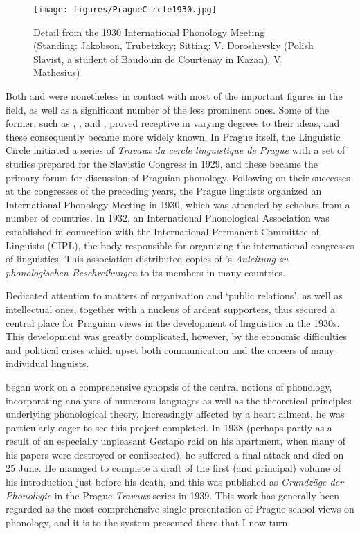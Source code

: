 \begin{wrapfigure}{r}{.4\textwidth}
  \texttt{[image: figures/PragueCircle1930.jpg]}
  \caption{Detail from the 1930 International Phonology Meeting\\
    (Standing: Jakobson, Trubetzkoy; Sitting: V. Doroshevsky (Polish
    Slavist, a student of Baudouin de Courtenay in Kazan),
    V. Mathesius)}
  \label{fig:ch.prague_trubetzkoy_prague_circle}
\end{wrapfigure}
Both {\Jakobson} and {\Trubetzkoy} were none\-the\-less in contact with most of the
important figures in the field, as well as a significant number of the
less prominent ones. Some of the former, such as {\Sapir}, {\Meillet}, and
, proved receptive in varying degrees to their ideas, and
these consequently became more widely known. In Prague itself, the
Linguistic Circle initiated a series of \textsl{Travaux du cercle
  linguistique de Prague} with a set of studies prepared for the
Slavistic Congress in 1929, and these became the primary forum for
discussion of Praguian phonology. Following on their successes at the
congresses of the preceding years, the Prague linguists organized an
International Phonology Meeting in 1930, which was attended by
scholars from a number of countries. In 1932, an International
Phonological Association was established in connection with the
International Permanent Committee of Linguists (CIPL), the body
responsible for organizing the international congresses of
linguistics. This association distributed copies of {\Trubetzkoy}'s
\textsl{Anleitung zu phonologischen Beschreibungen}
\citep{trubetzkoy68:principles} to its members in many countries.

Dedicated attention to matters of organization and `public relations',
as well as intellectual ones, together with a {nucleus} of ardent
supporters, thus secured a central place for Praguian views in the
development of linguistics in the 1930s. This development was greatly
complicated, however, by the economic difficulties and political
crises which upset both communication and the careers of many
individual linguists.

{\Trubetzkoy} began work on a comprehensive synopsis of the central
notions of phonology, incorporating analyses of numerous languages as
well as the theoretical principles underlying phonological
theory. Increasingly affected by a heart ailment, he was particularly
eager to see this project completed. In 1938 (perhaps partly as a
result of an especially unpleasant Gestapo raid on his apartment, when
many of his papers were destroyed or confiscated), he suffered a final
attack and died on 25 June. He managed to complete a draft of the
first (and principal) volume of his introduction just before his
death, and this was published as \textsl{Grundzüge der Phonologie}
\citep{trubetzkoy39:grundzuge} in the Prague \textsl{Travaux} series
in 1939. This work has generally been regarded as the most
comprehensive single presentation of Prague school views on phonology,
and it is to the system presented there that I now turn.

